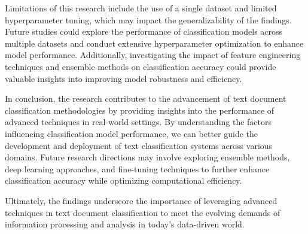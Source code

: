 Limitations of this research include the use of a single dataset and limited hyperparameter tuning, which may impact the generalizability of the findings. Future studies could explore the performance of classification models across multiple datasets and conduct extensive hyperparameter optimization to enhance model performance. Additionally, investigating the impact of feature engineering techniques and ensemble methods on classification accuracy could provide valuable insights into improving model robustness and efficiency.

In conclusion, the research contributes to the advancement of text document classification methodologies by providing insights into the performance of advanced techniques in real-world settings. By understanding the factors influencing classification model performance, we can better guide the development and deployment of text classification systems across various domains. Future research directions may involve exploring ensemble methods, deep learning approaches, and fine-tuning techniques to further enhance classification accuracy while optimizing computational efficiency.

Ultimately, the findings underscore the importance of leveraging advanced techniques in text document classification to meet the evolving demands of information processing and analysis in today's data-driven world.

